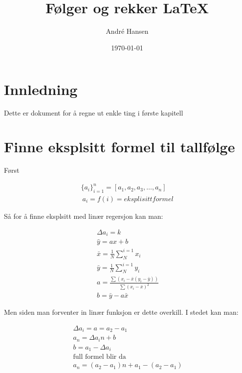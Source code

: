 \documentclass[12pt,a4paper]{article}
\title{Følger og rekker \LaTeX}
\author{André Hansen}
\date{\today}
\begin{document}
\maketitle
\onehalfspacing  %

\section*{Innledning}
Dette er dokument for å regne ut enkle ting i første kapitell

\section*{Finne eksplsitt formel til tallfølge }

Først

\begin{align}
\{a_i\}^n_{i=1} = [a_1,a_2,a_3,\ldots,a_n] \\
\ {a_i}=f(i)=eksplisitt formel
\end{align}

Så for å finne eksplsitt med linær regersjon kan man:

\begin{align}
\ {\Delta a_i=k} \\
\ \hat{y}=ax+b \\
\ \bar{x}=\frac{1}{N}\sum_{N}^{i=1} x_i \\
\ \bar{y}=\frac{1}{N}\sum_{N}^{i=1} y_i \\
\ a=\frac{\sum(x_i-\bar{x}(y_i-\bar{y}))}{\sum(x_i-\bar{x})^2} \\
\ b=\bar{y}-a\bar{x}
\end{align}

Men siden man forventer in linær funksjon er dette overkill. I stedet kan man:

\begin{align}
\ \Delta a_i=a=a_2-a_1 \\
\ a_n=\Delta a_i n + b \\
\ b=a_1-\Delta a_i \\
\ \text{full formel blir da} \\
\ a_n=(a_2-a_1)n+a_1-(a_2-a_1)
\end{align}
\end{document}
